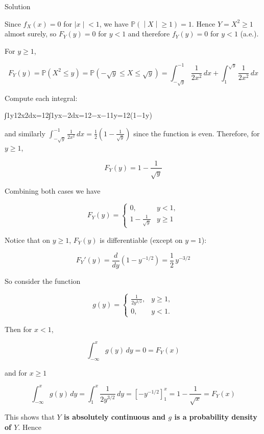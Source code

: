 \documentclass{qlnotes-export}
\begin{document}
\begin{qlsolution}{Solution}

Since \(f_{X}(x) = 0\) for \(\left. |x \middle| < 1 \right.\), we have \(\left. {\mathbb{P}}( \middle| X \middle| \geq 1) = 1 \right.\). Hence \(Y = X^{2} \geq 1\) almost surely, so \(F_{Y}(y) = 0\) for \(y < 1\) and therefore \(f_{Y}(y) = 0\) for \(y < 1\) (a.e.).

For \(y \geq 1\),

\[F_{Y}(y) = {\mathbb{P}}(X^{2} \leq y) = {\mathbb{P}}( - \sqrt{y} \leq X \leq \sqrt{y}) = \int_{- \sqrt{y}}^{- 1}\frac{1}{2x^{2}}\, dx + \int_{1}^{\sqrt{y}}\frac{1}{2x^{2}}\, dx\]

Compute each integral:

{∫1y12x2dx=12∫1yx−2dx=12−x−11y=12(1−1y)}

and similarly \(\int_{- \sqrt{y}}^{- 1}\frac{1}{2x^{2}}\, dx = \frac{1}{2}\left( {1 - \frac{1}{\sqrt{y}}} \right)\) since the function is even. Therefore, for \(y \geq 1\),

\[F_{Y}(y) = 1 - \frac{1}{\sqrt{y}}\]

Combining both cases we have

\[F_{Y}(y) = \left\{ \begin{matrix}
{0,} & {y < 1,} \\
{1 - \frac{1}{\sqrt{y}}} & {y \geq 1}
\end{matrix} \right.\]

Notice that on \(y \geq 1\), \(F_{Y}(y)\) is differentiable (except on \(y = 1\)):

\[F_{Y}'(y) = \frac{d}{dy}\left( {1 - y^{- 1/2}} \right) = \frac{1}{2}\, y^{- 3/2}\]

So consider the function

\[g(y) = \left\{ \begin{matrix}
{\frac{1}{2y^{3/2}},} & {y \geq 1,} \\
{0,} & {y < 1.}
\end{matrix} \right.\]

Then for \(x < 1\),

\[\int_{- \infty}^{x}g(y)\, dy = 0 = F_{Y}(x)\]

and for \(x \geq 1\)

\[\int_{- \infty}^{x}g(y)\, dy = \int_{1}^{x}\frac{1}{2y^{3/2}}\, dy = \left\lbrack {- y^{- 1/2}} \right\rbrack_{1}^{x} = 1 - \frac{1}{\sqrt{x}} = F_{Y}(x)\]

This shows that \textbf{\(Y\) is absolutely continuous and \(g\) is a probability density of \(Y\)}. Hence


\end{qlsolution}
\end{document}
